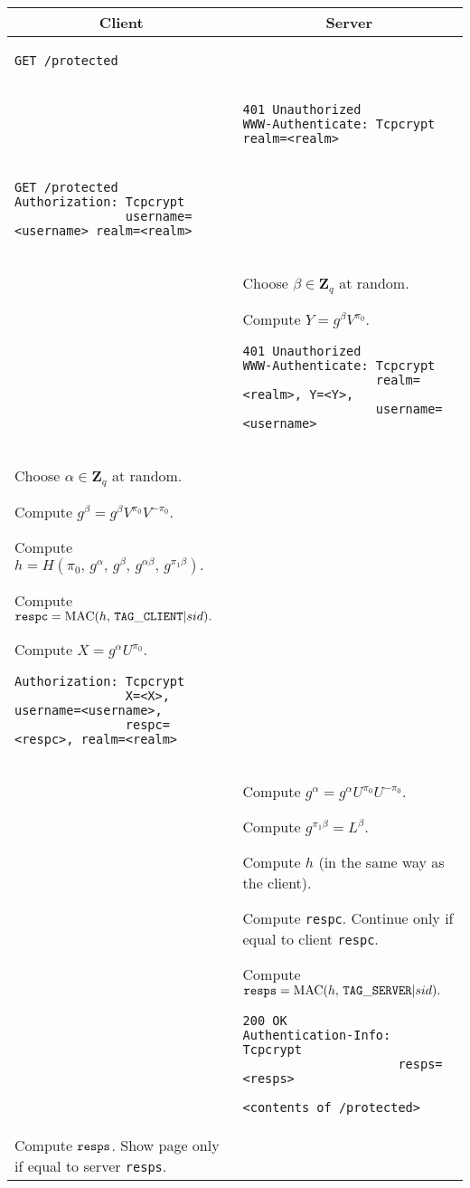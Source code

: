 \documentclass[10pt]{article}
\begin{document}
\begin{tabular}{p{9cm} | p{9cm}}
\multicolumn{1}{c}{\bf Client} & \multicolumn{1}{c}{\bf Server} \\
\hline
\begin{verbatim}
GET /protected
\end{verbatim} \\

& 
\begin{verbatim}
401 Unauthorized
WWW-Authenticate: Tcpcrypt realm=<realm>
\end{verbatim} \\


\begin{verbatim}
GET /protected
Authorization: Tcpcrypt 
               username=<username> realm=<realm>
\end{verbatim} \\

& Choose $\beta \in \mathbf{Z}_q$ at random.

Compute $Y=g^\beta V^{\pi_0}.$

\begin{verbatim}
401 Unauthorized
WWW-Authenticate: Tcpcrypt 
                  realm=<realm>, Y=<Y>,
                  username=<username>
\end{verbatim} \\

Choose $\alpha \in \mathbf{Z}_q$ at random.

Compute $g^\beta = g^\beta V^{\pi_0} V^{-\pi_0}.$

Compute $h = H(\pi_0,\, g^\alpha,\, g^\beta,\, g^{\alpha \beta},\, g^{\pi_1 \beta}).$

Compute ${\tt respc} = \operatorname{MAC}(h,\, {\tt TAG\_CLIENT} | sid).$

Compute $X=g^\alpha U^{\pi_0}.$

\begin{verbatim}
Authorization: Tcpcrypt 
               X=<X>, username=<username>,
               respc=<respc>, realm=<realm>
\end{verbatim}

& \\

& Compute $g^\alpha = g^\alpha U^{\pi_0} U^{-\pi_0}.$

Compute $g^{\pi_1 \beta} = L^\beta.$

Compute $h$ (in the same way as the client).

Compute {\tt respc}. Continue only if equal to client {\tt respc}.

Compute ${\tt resps} = \operatorname{MAC}(h,\, {\tt TAG\_SERVER} | sid).$
\begin{verbatim}
200 OK
Authentication-Info: Tcpcrypt 
                     resps=<resps>

<contents of /protected>
\end{verbatim} \\

Compute ${\tt resps}$. Show page only if equal to server {\tt resps}.
\end{tabular}
\end{document}
